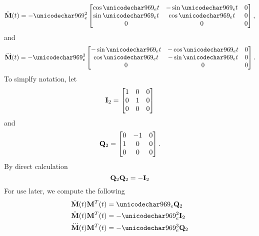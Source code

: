 \begin{equation}
 \ddot{\mtx{M}}(t) = -\omega^2_e\begin{bmatrix}
             \ct & -\st & 0\\
             \st & \ct  & 0\\
             0   & 0    & 0
            \end{bmatrix},
\end{equation}
and
\begin{equation}
 \dddot{\mtx{M}}(t) = -\omega^3_e\begin{bmatrix}
             -\st & -\ct & 0\\
             \ct & -\st  & 0\\
             0   & 0    & 0
            \end{bmatrix}.
\end{equation}
To simplfy notation, let
\begin{equation}
 \Itwo=\begin{bmatrix}
 1 & 0 & 0\\
 0 & 1 & 0\\
 0 & 0 & 0
\end{bmatrix}
\end{equation}
and
\begin{equation}
 \Qtwo=\begin{bmatrix}
 0 & -1 & 0\\
 1 & 0 & 0\\
 0 & 0 & 0
\end{bmatrix}.
\end{equation}
By direct calculation
\begin{equation}
 \Qtwo\Qtwo = -\Itwo 
\end{equation}
For use later, we compute the following
\begin{align}
\dot{\mtx{M}}(t)\mtx{M}^T(t) &= \omega_e\Qtwo\\
\ddot{\mtx{M}}(t)\mtx{M}^T(t) &= -\omega^2_e\Itwo\\
\dddot{\mtx{M}}(t)\mtx{M}^T(t) &= -\omega^3_e\Qtwo\\
\end{align}

